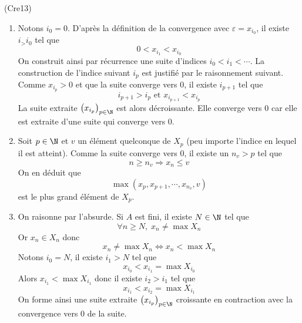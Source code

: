\begin{tiny}(Cre13)\end{tiny} 
\begin{enumerate}
  \item Notons $i_0=0$. D'après la définition de la convergence avec $\varepsilon = x_{i_0}$, il existe $i_ > i_0$ tel que 
\begin{displaymath}
  0 < x_{i_1} < x_{i_0}
\end{displaymath}
On construit ainsi par récurrence une suite d'indices $i_0 < i_1 < \cdots$. La construction de l'indice suivant $i_p$ est justifié par le raisonnement suivant.\newline
Comme $x_{i_p}>0$ et que la suite converge vers $0$, il existe $i_{p+1}$ tel que
\begin{displaymath}
  i_{p+1} > i_p \text{ et } x_{i_{p+1}} < x_{i_p}
\end{displaymath}
La suite extraite $\left( x_ {i_p}\right)_{p\in \N}$ est alors décroissante. Elle converge vers $0$ car elle est extraite d'une suite qui converge vers $0$. 
  \item Soit $p\in \N$ et $v$ un élément quelconque de $X_p$ (peu importe l'indice en lequel il est atteint). Comme la suite converge vers $0$, il existe un $n_v > p$ tel que 
\begin{displaymath}
  n\geq n_v \Rightarrow x_n \leq v
\end{displaymath}
On en déduit que 
\begin{displaymath}
  \max(x_p,x_{p+1},\cdots,x_{n_v},v)
\end{displaymath}
est le plus grand élément de $X_p$.
  \item On raisonne par l'absurde.\newline
Si $A$ est fini, il existe $N\in \N$ tel que 
\begin{displaymath}
\forall n \geq N, \; x_n \neq \max X_n  
\end{displaymath}
Or $x_n \in X_n$ donc
\begin{displaymath}
  x_n \neq \max X_n  \Leftrightarrow x_n < \max X_n
\end{displaymath}
Notons $i_0 = N$, il existe $i_1 > N$ tel que 
\begin{displaymath}
x_{i_0} < x_{i_1} = \max X_{i_0} 
\end{displaymath}
Alors $x_{i_1} < \max X_{i_1}$ donc il existe $i_2 > i_1$ tel que 
\begin{displaymath}
  x_{i_1} < x_{i_2} = \max X_{i_1}
\end{displaymath}
On forme ainsi une suite extraite $\left( x_ {i_p}\right)_{p\in \N}$ croissante en contraction avec la convergence vers $0$ de la suite.
\end{enumerate}
 